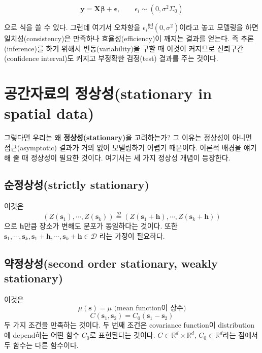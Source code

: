 \documentclass[b5paper,]{scrbook}
\theoremstyle{plain}
\theoremstyle{definition}
\numberwithin{equation}{section}
\begin{document}
\begin{equation}
\mathbf{y}=\mathbf{X}\boldsymbol{\beta}+\boldsymbol{\epsilon}, \qquad{\epsilon_{i} \sim (0, \sigma^{2}\Sigma_{0})}
\end{equation}

으로 식을 쓸 수 있다. 그런데 여기서 오차항을
\(\epsilon_{i} \stackrel{\text{iid}}{\sim} (0, \sigma^{2})\)이라고 놓고
모델링을 하면 일치성(consistency)은 만족하나 효율성(efficiency)이 깨지는
결과를 얻는다. 즉 추론(inference)를 하기 위해서 변동(variability)을 구할
때 이것이 커지므로 신뢰구간(confidence interval)도 커지고 부정확한
검정(test) 결과를 주는 것이다.

\section{공간자료의 정상성(stationary in spatial
data)}\label{-stationary-in-spatial-data}

그렇다면 우리는 왜 \textbf{정상성(stationary)}을 고려하는가? 그 이유는
정상성이 아니면 점근(asymptotic) 결과가 거의 없어 모델링하기 어렵기
때문이다. 이론적 배경을 얘기해 줄 때 정상성이 필요한 것이다. 여기서는 세
가지 정상성 개념이 등장한다.

\subsection{순정상성(strictly stationary)}\label{strictly-stationary}

이것은
\[(Z(\mathbf{s}_{1}), \cdots , Z(\mathbf{s}_{k})) \stackrel{\mathcal{D}}{=} (Z(\mathbf{s}_{1}+\mathbf{h}), \cdots , Z(\mathbf{s}_{k}+\mathbf{h}))\]
으로 \(\mathbf{h}\)만큼 장소가 변해도 분포가 동일하다는 것이다. 또한
\(\mathbf{s}_{1}, \cdots , \mathbf{s}_{k}, \mathbf{s}_{1}+\mathbf{h}, \cdots , \mathbf{s}_{k}+\mathbf{h} \in \mathcal{D}\)
라는 가정이 필요하다.

\subsection{약정상성(second order stationary, weakly
stationary)}\label{second-order-stationary-weakly-stationary}

이것은 \[\mu(\mathbf{s})=\mu \text{ (mean function이 상수)}\]
\[C(\mathbf{s}_{1},\mathbf{s}_{2})=C_{0}(\mathbf{s}_{1}-\mathbf{s}_{2})\]
두 가지 조건을 만족하는 것이다. 두 번째 조건은 covariance function이
distribution에 depend하는 어떤 함수 \(C_{0}\)로 표현된다는 것이다.
\(C \in \mathbb{R}^{d}\times \mathbb{R}^{d}\),
\(C_{0} \in \mathbb{R}^{d}\)라는 점에서 두 함수는 다른 함수이다.
\end{document}
